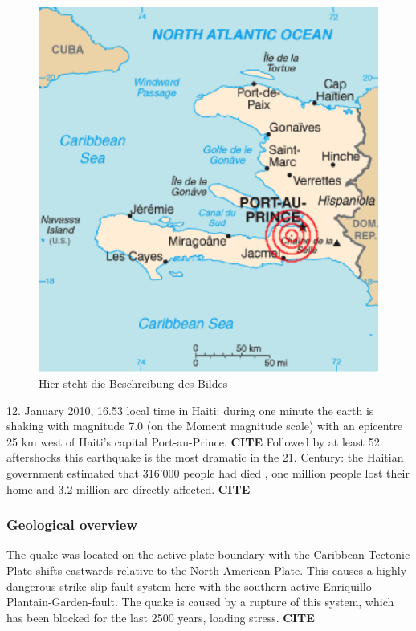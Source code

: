 \documentclass[11pt]{article}
\begin{document}
\begin{figure}
\includegraphics[scale=0.8]{Bilder/KarteHaiti.png}
\caption{Hier steht die Beschreibung des Bildes}%
\label{pic:map_haiti}
\end{figure}




12. January 2010, 16.53 local time in Haiti: during one minute the earth is shaking with magnitude 7.0  (on the Moment magnitude scale) with an epicentre 25 km west of Haiti’s capital Port-au-Prince. \textbf{CITE} Followed by at least 52 aftershocks  this earthquake is the most dramatic in the 21. Century: the Haitian government estimated that 316’000 people had died , one million people lost their home  and 3.2 million are directly affected. \textbf{CITE}

\subsubsection*{Geological overview}

The quake was located on the active plate boundary with the Caribbean Tectonic Plate shifts eastwards relative to the North American Plate. This causes a highly dangerous strike-slip-fault system here with the southern active Enriquillo-Plantain-Garden-fault. The quake is caused by a rupture of this system, which has been blocked for the last 2500 years, loading stress. \textbf{CITE}
\end{document}
